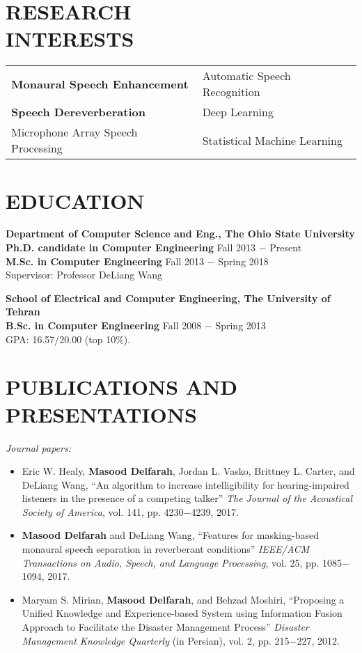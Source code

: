 \documentclass[margin, 10pt]{res}
\begin{document}
\begin{resume}
\section{RESEARCH\\INTERESTS}

\begin{tabular}{l l}
\textbf{Monaural Speech Enhancement}    & \hspace{0.3in}   Automatic Speech Recognition\\ 
\textbf{Speech Dereverberation}    & \hspace{0.3in}    Deep Learning\\ 
Microphone Array Speech Processing  & \hspace{0.3in} Statistical Machine Learning
\end{tabular}

\section{EDUCATION}
\textbf{Department of Computer Science and Eng., The Ohio State University }  \\
\textbf{Ph.D. candidate in Computer Engineering} \hfill Fall 2013 $-$ Present \\
\textbf{M.Sc. in Computer Engineering} \hfill Fall 2013 $-$ Spring 2018 \\
Supervisor: Professor DeLiang Wang

\textbf{School of Electrical and Computer Engineering, The University of Tehran}\\
\textbf{B.Sc. in Computer Engineering} \hfill Fall 2008 $-$ Spring 2013 \\
GPA: 16.57/20.00 (top 10\%).


\section{PUBLICATIONS AND PRESENTATIONS}
\textit{Journal papers:}
\begin{itemize}
\item Eric W. Healy, \textbf{Masood Delfarah}, Jordan L. Vasko, Brittney L. Carter, and DeLiang Wang, ``An algorithm to increase intelligibility for hearing-impaired listeners in the presence of a competing talker'' \textit{The Journal of the Acoustical Society of America}, vol. 141, pp. 4230$-$4239, 2017.
\item \textbf{Masood Delfarah} and DeLiang Wang, ``Features for masking-based monaural speech separation in reverberant conditions'' \textit{IEEE/ACM Transactions on Audio, Speech, and Language Processing}, vol. 25, pp. 1085$-$1094, 2017.
\item Maryam S. Mirian, \textbf{Masood Delfarah}, and Behzad Moshiri, ``Proposing a Unified Knowledge and Experience-based System using Information Fusion Approach to Facilitate the Disaster Management Process'' \textit{Disaster Management Knowledge Quarterly} (in Persian), vol. 2, pp. 215$-$227, 2012. 
\end{itemize}


\end{resume}
\end{document}
